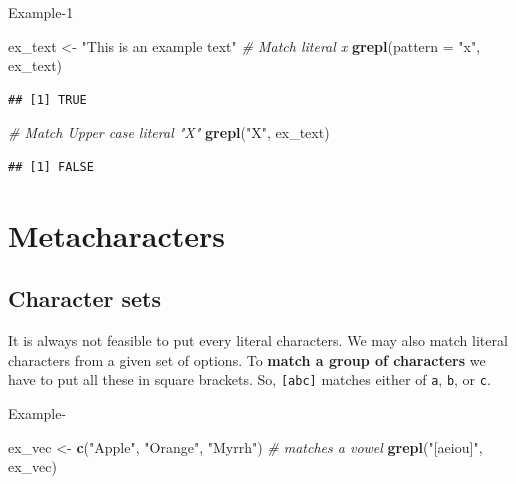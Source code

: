 \documentclass[
]{book}
\newenvironment{Shaded}{\begin{snugshade}}{\end{snugshade}}
\newcommand{\AttributeTok}[1]{\textcolor[rgb]{0.13,0.29,0.53}{#1}}
\newcommand{\CommentTok}[1]{\textcolor[rgb]{0.56,0.35,0.01}{\textit{#1}}}
\newcommand{\FunctionTok}[1]{\textcolor[rgb]{0.13,0.29,0.53}{\textbf{#1}}}
\newcommand{\NormalTok}[1]{#1}
\newcommand{\OtherTok}[1]{\textcolor[rgb]{0.56,0.35,0.01}{#1}}
\newcommand{\StringTok}[1]{\textcolor[rgb]{0.31,0.60,0.02}{#1}}
\begin{document}
Example-1

\begin{Shaded}
\begin{Highlighting}[]
\NormalTok{ex\_text }\OtherTok{\textless{}{-}} \StringTok{"This is an example text"}
\CommentTok{\# Match literal \textasciigrave{}x\textasciigrave{}}
\FunctionTok{grepl}\NormalTok{(}\AttributeTok{pattern =} \StringTok{"x"}\NormalTok{, ex\_text)}
\end{Highlighting}
\end{Shaded}

\begin{verbatim}
## [1] TRUE
\end{verbatim}

\begin{Shaded}
\begin{Highlighting}[]
\CommentTok{\# Match Upper case literal "X"}
\FunctionTok{grepl}\NormalTok{(}\StringTok{"X"}\NormalTok{, ex\_text)}
\end{Highlighting}
\end{Shaded}

\begin{verbatim}
## [1] FALSE
\end{verbatim}

\hypertarget{metacharacters}{%
\section{Metacharacters}\label{metacharacters}}

\hypertarget{character-sets}{%
\subsection{Character sets}\label{character-sets}}

It is always not feasible to put every literal characters. We may also match literal characters from a given set of options. To \textbf{match a group of characters} we have to put all these in square brackets. So, \texttt{{[}abc{]}} matches either of \texttt{a}, \texttt{b}, or \texttt{c}.

Example-

\begin{Shaded}
\begin{Highlighting}[]
\NormalTok{ex\_vec }\OtherTok{\textless{}{-}} \FunctionTok{c}\NormalTok{(}\StringTok{"Apple"}\NormalTok{, }\StringTok{"Orange"}\NormalTok{, }\StringTok{"Myrrh"}\NormalTok{)}
\CommentTok{\# matches a vowel}
\FunctionTok{grepl}\NormalTok{(}\StringTok{"[aeiou]"}\NormalTok{, ex\_vec)}
\end{Highlighting}
\end{Shaded}
\end{document}
